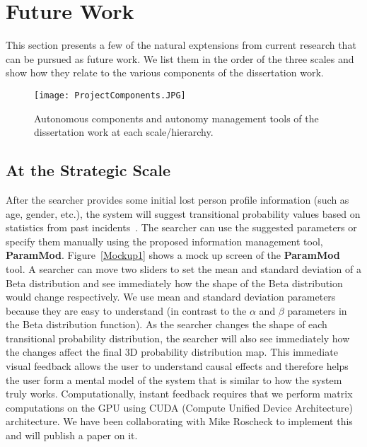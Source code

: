 \section{Future Work}
\label{futurework}

This section presents a few of the natural exptensions from current research that can be pursued as future work. We list them in the order of the three scales and show how they relate to the various components of the dissertation work.

\begin{figure}
\centering
\texttt{[image: ProjectComponents.JPG]}
\caption{Autonomous components and autonomy management tools of the dissertation work at each scale/hierarchy.}
\label{ProjectComponents2}
\end{figure}

\subsection{At the Strategic Scale}

After the searcher provides some initial lost person profile information (such as age, gender, etc.), the system will suggest transitional probability values based on statistics from past incidents~\cite{Koester2008Lost}. The searcher can use the suggested parameters or specify them manually using the proposed information management tool, \textbf{ParamMod}. Figure~\ref{Mockup1} shows a mock up screen of the \textbf{ParamMod} tool. A searcher can move two sliders to set the mean and standard deviation of a Beta distribution and see immediately how the shape of the Beta distribution would change respectively. We use mean and standard deviation parameters because they are easy to understand (in contrast to the $\alpha$ and $\beta$ parameters in the Beta distribution function). As the searcher changes the shape of each transitional probability distribution, the searcher will also see immediately how the changes affect the final 3D probability distribution map. This immediate visual feedback allows the user to understand causal effects and therefore helps the user form a mental model of the system that is similar to how the system truly works. Computationally, instant feedback requires that we perform matrix computations on the GPU using CUDA (Compute Unified Device Architecture) architecture. We have been collaborating with Mike Roscheck to implement this and will publish a paper on it.

